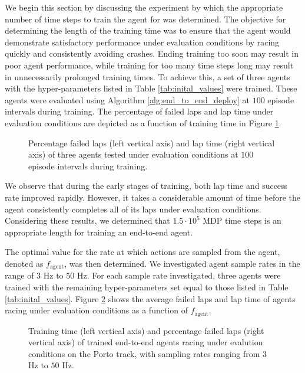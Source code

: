 We begin this section by discussing the experiment by which the appropriate number of time steps to train the agent for was determined.
The objective for determining the length of the training time was to ensure that the agent would demonstrate satisfactory performance under evaluation conditions by racing quickly and consistently avoiding crashes. 
Ending training too soon may result in poor agent performance, while training for too many time steps long may result in unnecessarily prolonged training times. 
To achieve this, a set of three agents with the hyper-parameters listed in Table \ref{tab:inital_values} were trained.
These agents were evaluated using Algorithm \ref{alg:end_to_end_deploy} at $100$ episode intervals during training.
The percentage of failed laps and lap time under evaluation conditions are depicted as a function of training time in Figure \ref{fig:MDP_steps}. 

\begin{figure}[htb!]
    \centering
    
    \caption[Percentage failed laps and lap time of an end-to-end agent during training]{Percentage failed laps (left vertical axis) and lap time (right vertical axis) of three agents tested under evaluation conditions at $100$ episode intervals during training.}
    \label{fig:MDP_steps}
\end{figure}

We observe that during the early stages of training, both lap time and success rate improved rapidly. 
However, it takes a considerable amount of time before the agent consistently completes all of its laps under evaluation conditions. 
Considering these results, we determined that $1.5\cdot10^{5}$ MDP time steps is an appropriate length for training an end-to-end agent.



The optimal value for the rate at which actions are sampled from the agent, denoted as $f_{\text{agent}}$, was then determined.
We investigated agent sample rates in the range of $3$ Hz to $50$ Hz.
For each sample rate investigated, three agents were trained with the remaining hyper-parameters set equal to those listed in Table \ref{tab:inital_values}.
Figure \ref{fig:f_agent} shows the average failed laps and lap time of agents racing under evaluation conditions as a function of $f_{\text{agent}}$.  

\begin{figure}[htb!]
    \centering
    
    \caption[Training time and percentage failed laps under evaluation conditions of end-to-end agents with various sampling rates]{Training time (left vertical axis) and percentage failed laps (right vertical axis) of trained end-to-end agents racing under evalution conditions on the Porto track, with sampling rates ranging from $3$ Hz to $50$ Hz.}
    \label{fig:f_agent}
\end{figure}

